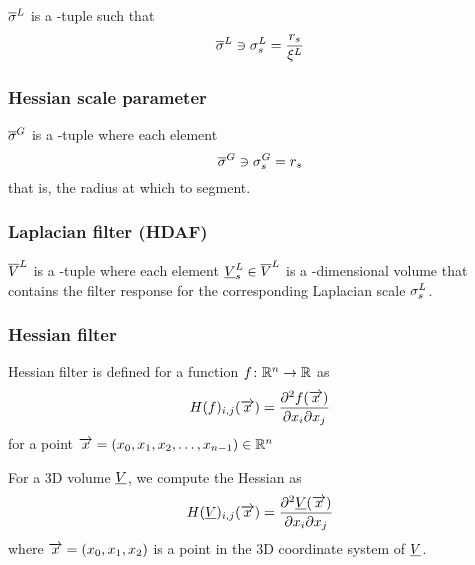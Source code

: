 \documentclass[12pt]{article}
\begin{document}
\(\overline{\sigma}^{L}\) is a \Dim{\RadiiScalesName}-tuple such that
\begin{equation*}
	\overline{\sigma}^{L} \ni \sigma^{L}_{s}{} = \frac{r_{s}{}}{\xi^{L}}
\end{equation*}


\subsubsection{Hessian scale parameter}

\(\overline{\sigma}^{G}\) is a \Dim{\RadiiScalesName}-tuple where each element
\begin{equation*}
	\overline{\sigma}^{G} \ni \sigma^{G}_{s}{} = r_{s}{}
\end{equation*}
that is, the radius at which to segment.

\subsubsection{Laplacian filter (HDAF)}

\(\overline{V}^{L}\) is a \Dim{\RadiiScalesName}-tuple
where each element \(\underline{V}^{L}_{s} \in \overline{V}^{L}\)
is a \Dim{\InputVolumeName}-dimensional volume
that contains the filter response for the corresponding Laplacian scale \(\sigma^{L}_{s}\).

\subsubsection{Hessian filter}


Hessian filter is defined for a function \(f\colon \mathbb{R}^{n} \to \mathbb{R}\)
as
\begin{equation*}
	H(f)_{i,j}(\overrightarrow{x}) = \frac{\partial{}^{2} f(\overrightarrow{x})}{\partial{}x_{i}\partial{}x_{j}}
\end{equation*}
for a point \(\overrightarrow{x} = (x_0, x_1, x_2, \dotsc, x_{n-1}) \in \mathbb{R}^{n}\)

For a 3D volume \(\underline{V}\), we compute the Hessian as
\begin{equation*}
	H(\underline{V})_{i,j}(\overrightarrow{x}) = \frac{\partial{}^{2} \underline{V}(\overrightarrow{x})}{\partial{}x_{i}\partial{}x_{j}}
\end{equation*}
where \(\overrightarrow{x} = (x_{0}, x_{1}, x_{2})\) is a point in the 3D
coordinate system of \(\underline{V}\).
\end{document}

